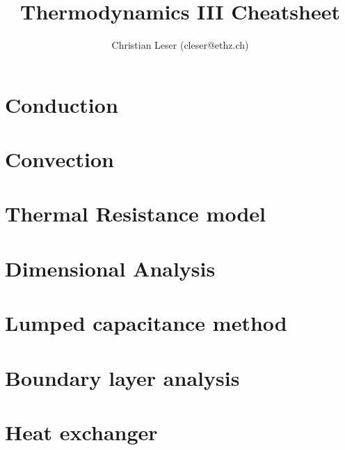 \documentclass[numerate]{article}
\author{Christian Leser (cleser@ethz.ch) \\ \vspace*{-0.2em}}
\title{Thermodynamics III Cheatsheet}
\date{}
\begin{document}
\maketitle

\section{Conduction}
	
	
	

\section{Convection}
	

\section{Thermal Resistance model}
	

\section{Dimensional Analysis}
	
	
	

\section{Lumped capacitance method}
	
	

\section{Boundary layer analysis}
	
	

\section{Heat exchanger}
	
	
\end{document}
